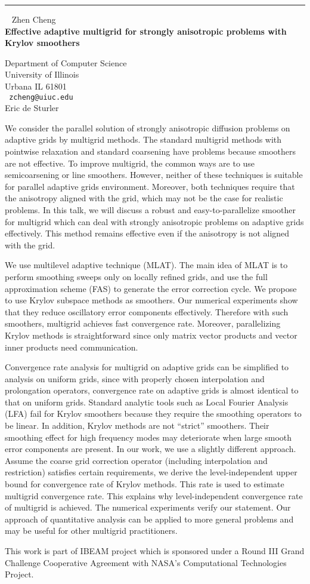 \documentclass{report}
\begin{document}
\begin{center}

\rule{6in}{1pt} \
{\large
Zhen Cheng
\\ {\bf
Effective adaptive multigrid for strongly anisotropic problems with
Krylov smoothers
}}

Department of Computer Science
\\
University of Illinois
\\
Urbana IL 61801
\\ {\tt
zcheng@uiuc.edu
}
\\
Eric de Sturler
\end{center}

We consider the parallel solution of strongly anisotropic diffusion
problems on adaptive grids by multigrid methods. The standard multigrid
methods with pointwise relaxation and standard coarsening have problems
because smoothers are not effective. To improve multigrid, the common
ways are to use semicoarsening or line smoothers. However, neither of
these techniques is suitable for parallel adaptive grids environment.
Moreover, both techniques require that the anisotropy aligned with the
grid, which may not be the case for realistic problems. In this talk,
we will discuss a robust and easy-to-parallelize smoother for multigrid
which can deal with strongly anisotropic problems on adaptive grids
effectively. This method remains effective even if the anisotropy is
not aligned with the grid.

We use multilevel adaptive technique (MLAT). The main idea of MLAT is
to perform smoothing sweeps only on locally refined grids, and use the
full approximation scheme (FAS) to generate the error correction cycle.
We propose to use Krylov subspace methods as smoothers. Our numerical
experiments show that they reduce oscillatory error components
effectively. Therefore with such smoothers, multigrid achieves fast
convergence rate. Moreover, parallelizing Krylov methods is
straightforward since only matrix vector products and vector inner
products need communication.

Convergence rate analysis for multigrid on adaptive grids can be
simplified to analysis on uniform grids, since with properly chosen
interpolation and prolongation operators, convergence rate on adaptive
grids is almost identical to that on uniform grids. Standard analytic
tools such as Local Fourier Analysis (LFA) fail for Krylov smoothers
because they require the smoothing operators to be linear. In addition,
Krylov methods are not ``strict'' smoothers. Their smoothing effect for
high frequency modes may deteriorate when large smooth error components
are present. In our work, we use a slightly different approach. Assume
the coarse grid correction operator (including interpolation and
restriction) satisfies certain requirements, we derive the
level-independent upper bound for convergence rate of Krylov methods.
This rate is used to estimate multigrid convergence rate. This explains
why level-independent convergence rate of multigrid is achieved. The
numerical experiments verify our statement. Our approach of
quantitative analysis can be applied to more general problems and may
be useful for other multigrid practitioners.

This work is part of IBEAM project which is sponsored under a Round III
Grand Challenge Cooperative Agreement with NASA's Computational
Technologies Project. 
\end{document}
